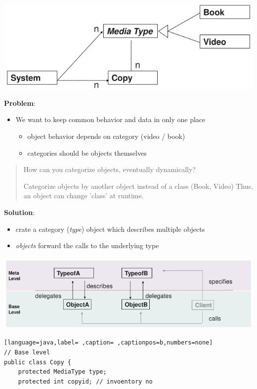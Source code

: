 \documentclass[11pt,twoside,landscape]{article}
\begin{document}
\begin{multicols}{3}
{
\begin{center}
\includegraphics[width=.9\linewidth]{img/rental_system_example.png}
\end{center}
\label{fig:rental-system-example}
}
\textbf{Problem}:
\begin{itemize}
\item We want to keep common behavior and data in only one place
\begin{itemize}
\item object behavior depends on category (video / book)
\item categories should be objects themselves
\end{itemize}
\end{itemize}

\begin{quote}
How can you categorize objects, eventually dynamically?

Categorize objects by another object instead of a class (Book, Video)
Thus, an object can change 'class' at runtime.
\end{quote}


\textbf{Solution}:
\begin{itemize}
\item crate a category (\emph{type}) object which describes multiple objects
\item \emph{objects} forward the calls to the underlying type
\end{itemize}


{
\begin{center}
\includegraphics[width=.9\linewidth]{img/type_object_meta_base_level.png}
\end{center}
\label{fig:meta-base-level-interactions}
}
\begin{lstlisting}[language=java,label= ,caption= ,captionpos=b,numbers=none]
// Base level
public class Copy {
    protected MediaType type;
    protected int copyid; // invoentory no


\end{lstlisting}
\end{multicols}
\end{document}
